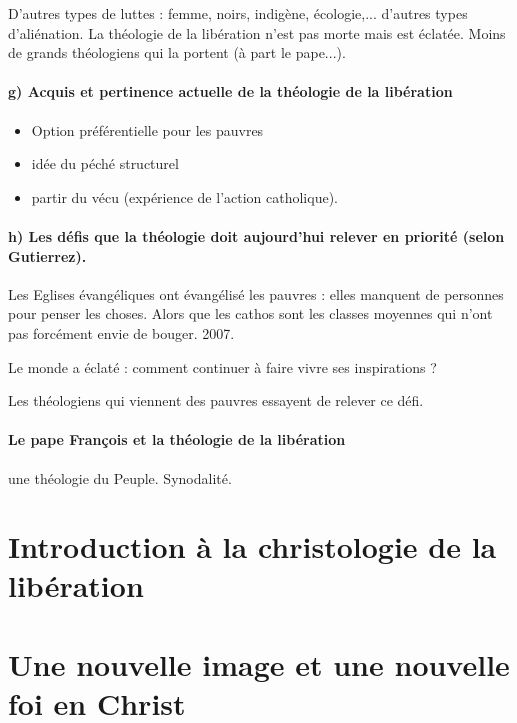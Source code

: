 D'autres types de luttes : femme, noirs, indigène, écologie,... d'autres types d'aliénation. 
La théologie de la libération n'est pas morte mais est éclatée. Moins de grands théologiens qui la portent (à part le pape...). 

\paragraph{g) Acquis et pertinence actuelle de la théologie de la libération}

\begin{itemize}
    \item Option préférentielle pour les pauvres
    \item idée du péché structurel
\item partir du vécu (expérience de l'action catholique).
    
\end{itemize}



\paragraph{h) Les défis que la théologie doit aujourd’hui relever en priorité (selon Gutierrez).}

Les Eglises évangéliques ont évangélisé les pauvres : elles manquent de personnes pour penser les choses. Alors que les cathos sont les classes moyennes qui n'ont pas forcément envie de bouger. 2007.

Le monde a éclaté : comment continuer à faire vivre ses inspirations ?

Les théologiens qui viennent des pauvres essayent de relever ce défi.

\paragraph{Le pape François et la théologie de la libération} une théologie du Peuple. Synodalité.

\section{Introduction à la christologie de la libération}

\section{Une nouvelle image et une nouvelle foi en Christ}

